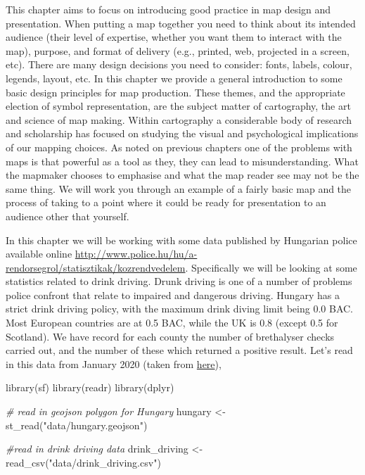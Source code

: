\documentclass[
]{book}
\newenvironment{Shaded}{\begin{snugshade}}{\end{snugshade}}
\newcommand{\CommentTok}[1]{\textcolor[rgb]{0.56,0.35,0.01}{\textit{#1}}}
\newcommand{\FunctionTok}[1]{\textcolor[rgb]{0.00,0.00,0.00}{#1}}
\newcommand{\NormalTok}[1]{#1}
\newcommand{\OtherTok}[1]{\textcolor[rgb]{0.56,0.35,0.01}{#1}}
\newcommand{\StringTok}[1]{\textcolor[rgb]{0.31,0.60,0.02}{#1}}
\begin{document}
This chapter aims to focus on introducing good practice in map design and presentation. When putting a map together you need to think about its intended audience (their level of expertise, whether you want them to interact with the map), purpose, and format of delivery (e.g., printed, web, projected in a screen, etc). There are many design decisions you need to consider: fonts, labels, colour, legends, layout, etc. In this chapter we provide a general introduction to some basic design principles for map production. These themes, and the appropriate election of symbol representation, are the subject matter of cartography, the art and science of map making. Within cartography a considerable body of research and scholarship has focused on studying the visual and psychological implications of our mapping choices. As noted on previous chapters one of the problems with maps is that powerful as a tool as they, they can lead to misunderstanding. What the mapmaker chooses to emphasise and what the map reader see may not be the same thing. We will work you through an example of a fairly basic map and the process of taking to a point where it could be ready for presentation to an audience other that yourself.

In this chapter we will be working with some data published by Hungarian police available online \url{http://www.police.hu/hu/a-rendorsegrol/statisztikak/kozrendvedelem}. Specifically we will be looking at some statistics related to drink driving. Drunk driving is one of a number of problems police confront that relate to impaired and dangerous driving. Hungary has a strict drink driving policy, with the maximum drink diving limit being 0.0 BAC. Most European countries are at 0.5 BAC, while the UK is 0.8 (except 0.5 for Scotland). We have record for each county the number of brethalyser checks carried out, and the number of these which returned a positive result. Let's read in this data from January 2020 (taken from \href{http://www.police.hu/sites/default/files/Kozrendvedelem\%20SK\%202021_01.pdf}{here}),

\begin{Shaded}
\begin{Highlighting}[]
\FunctionTok{library}\NormalTok{(sf)}
\FunctionTok{library}\NormalTok{(readr)}
\FunctionTok{library}\NormalTok{(dplyr)}


\CommentTok{\# read in geojson polygon for Hungary}
\NormalTok{hungary }\OtherTok{\textless{}{-}} \FunctionTok{st\_read}\NormalTok{(}\StringTok{"data/hungary.geojson"}\NormalTok{)}

\CommentTok{\#read in drink driving data }
\NormalTok{drink\_driving }\OtherTok{\textless{}{-}} \FunctionTok{read\_csv}\NormalTok{(}\StringTok{"data/drink\_driving.csv"}\NormalTok{)}
\end{Highlighting}
\end{Shaded}
\end{document}
